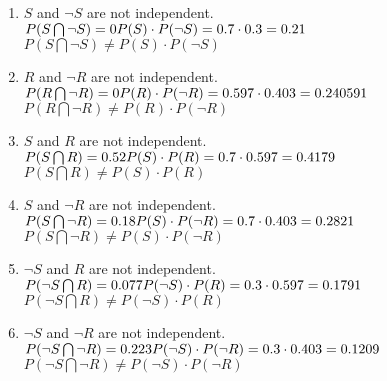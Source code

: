 \documentclass[paper=a4, fontsize=11pt]{scrartcl} %
\numberwithin{equation}{section} %
\numberwithin{figure}{section} %
\begin{document}
\begin{enumerate}
\item $S$ and $\neg S$ are not independent.\\
$P(S \bigcap \neg S) = 0\\ P(S) \cdot P(\neg S) = 0.7 \cdot 0.3= 0.21$\\
$P(S \bigcap \neg S) \neq P(S) \cdot P(\neg S)$\\

\item $R$ and $\neg R$ are not independent.\\
$P(R \bigcap \neg R) = 0\\ P(R) \cdot P(\neg R) = 0.597 \cdot 0.403 = 0.240591$\\
$P(R \bigcap \neg R) \neq P(R) \cdot P(\neg R)$\\
\item $S$ and $R$ are not independent.\\
$P(S \bigcap R) = 0.52\\ P(S) \cdot P(R) = 0.7 \cdot 0.597 = 0.4179$\\
$P(S \bigcap R) \neq P(S) \cdot P(R)$\\
\item $S$ and $\neg R$ are not independent.\\
$P(S \bigcap \neg R) = 0.18\\ P(S) \cdot P(\neg R) = 0.7 \cdot 0.403 = 0.2821$\\
$P(S \bigcap \neg R) \neq P(S) \cdot P(\neg R)$\\
\item $\neg S$ and $R$ are not independent.\\
$P(\neg S \bigcap R) = 0.077\\ P(\neg S) \cdot P(R) = 0.3 \cdot 0.597 = 0.1791$\\
$P(\neg S \bigcap R) \neq P(\neg S) \cdot P(R)$\\
\item $\neg S$ and $\neg R$ are not independent.\\
$P(\neg S \bigcap \neg R) = 0.223\\ P(\neg S) \cdot P(\neg R) = 0.3 \cdot 0.403= 0.1209$\\
$P(\neg S \bigcap \neg R) \neq P(\neg S) \cdot P(\neg R)$\\
\end{enumerate}

\end{document}
